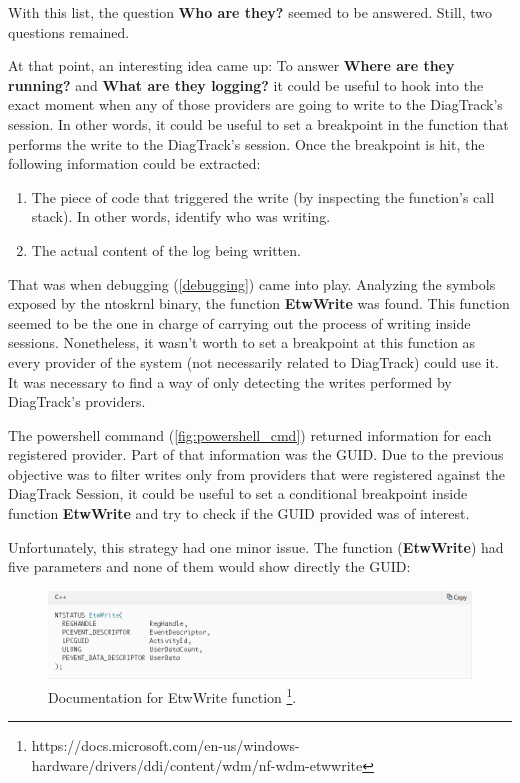 With this list, the question {\bfseries Who are they?} seemed to be answered. Still, two questions remained.

At that point, an interesting idea came up: To answer {\bfseries Where are they running?} and {\bfseries What are they logging?} it could be useful to hook into the exact moment when any of those providers are going to write to the DiagTrack's session. 
In other words, it could be useful to set a breakpoint in the function that performs the write to the DiagTrack's session. Once the breakpoint is hit, the following information could be extracted:

\begin{enumerate}
\setlength\itemsep{0.05em}
\item The piece of code that triggered the write (by inspecting the function's call stack). In other words, identify who was writing. 
\item The actual content of the log being written.
\end{enumerate} 

That was when debugging (\ref{debugging}) came into play. Analyzing the symbols exposed by the ntoskrnl binary, the function {\bfseries EtwWrite} was found. This function seemed to be the one in charge of carrying out the process of writing inside sessions. Nonetheless, it wasn't worth to set a breakpoint at this function as every provider of the system (not necessarily related to DiagTrack) could use it. 
It was necessary to find a way of only detecting the writes performed by DiagTrack's providers. 

The powershell command (\ref{fig:powershell_cmd}) returned information for each registered provider. Part of that information was the GUID. Due to the previous objective was to filter writes only from providers that were registered against the DiagTrack Session, it could be useful to set a conditional breakpoint inside function {\bfseries EtwWrite} and try to check if the GUID provided was of interest. 

Unfortunately, this strategy had one minor issue. The function ({\bfseries EtwWrite}) had five parameters and none of them would show directly the GUID:

\begin{figure}[H]
  \includegraphics[width=\linewidth]{images/etw_write_docu.png}
  \caption[]{Documentation for EtwWrite function \footnote{https://docs.microsoft.com/en-us/windows-hardware/drivers/ddi/content/wdm/nf-wdm-etwwrite}. }
  \label{fig:etw_write_docu}
\end{figure}

